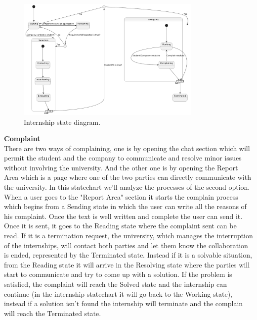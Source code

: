 \begin{figure}[H]
        \centering
        \includegraphics[width=0.8\textwidth]{Assets/Statecharts/Internship_SC.png}
        \caption{Internship state diagram.}
        \label{fig:Internship state diagram.}
    \end{figure}
\textbf{Complaint}\\
There are two ways of complaining, one is by opening the chat section which will permit the student and the company to communicate and resolve minor issues without involving the university. And the other one is by opening the Report Area which is a page where one of the two parties can directly communicate with the university. In this statechart we'll analyze the processes of the second option.
When a user goes to the "Report Area" section it starts the complain process which begins from a Sending state in which the user can write all the reasons of his complaint. Once the text is well written and complete the user can send it. Once it is sent, it goes to the Reading state where the complaint sent can be read. If it is a termination request, the university, which manages the interruption of the internships, will contact both parties and let them know the collaboration is ended, represented by the Terminated state. Instead if it is a solvable situation, from the Reading state it will arrive in the Resolving state where the parties will start to communicate and try to come up with a solution. If the problem is satisfied, the complaint will reach the Solved state and the internship can continue (in the internship statechart it will go back to the Working state), instead if a solution isn't found the internship will terminate and the complain will reach the Terminated state.\\
